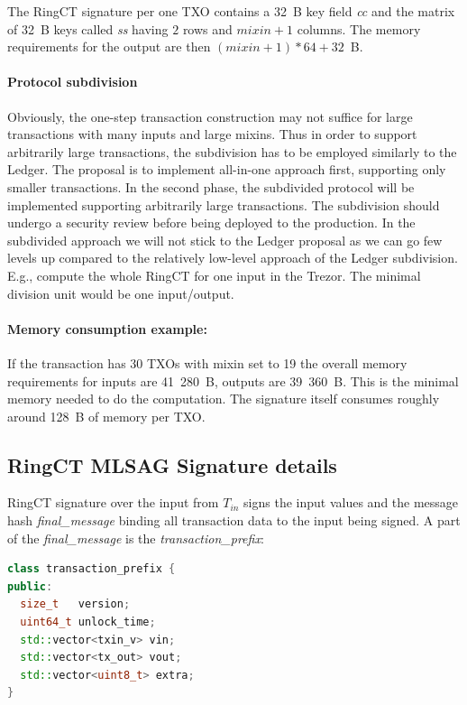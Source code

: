 \documentclass[]{article}
\begin{document}
The RingCT signature per one TXO contains a 32~B key field \emph{cc} and the matrix of 32~B keys called \emph{ss} having $2$ rows and $mixin + 1$ columns. The memory requirements for the output are then $(mixin + 1) * 64 + 32$~B.

\paragraph{Protocol subdivision}

Obviously, the one-step transaction construction may not suffice for large transactions with many inputs and large mixins. Thus in order to support arbitrarily large transactions, the subdivision has to be employed similarly to the Ledger. The proposal is to implement all-in-one approach first, supporting only smaller transactions. In the second phase, the subdivided protocol will be implemented supporting arbitrarily large transactions. The subdivision should undergo a security review before being deployed to the production. In the subdivided approach we will not stick to the Ledger proposal as we can go few levels up compared to the relatively low-level approach of the Ledger subdivision. E.g., compute the whole RingCT for one input in the Trezor. The minimal division unit would be one input/output.

\paragraph{Memory consumption example:}
If the transaction has 30 TXOs with mixin set to 19 the overall memory requirements for inputs are 41~280~B, outputs are 39~360~B. This is the minimal memory needed to do the computation. The signature itself consumes roughly around 128~B of memory per TXO.

\subsection{RingCT MLSAG Signature details}

RingCT signature over the input from $T_{in}$ signs the input values and the message hash \emph{final\_message} binding all transaction data to the input being signed. A part of the \emph{final\_message} is the \emph{transaction\_prefix}:

\begin{lstlisting}[language=c++]
class transaction_prefix {
public:
  size_t   version;
  uint64_t unlock_time;  
  std::vector<txin_v> vin;
  std::vector<tx_out> vout;
  std::vector<uint8_t> extra;
}
\end{lstlisting}
\end{document}
